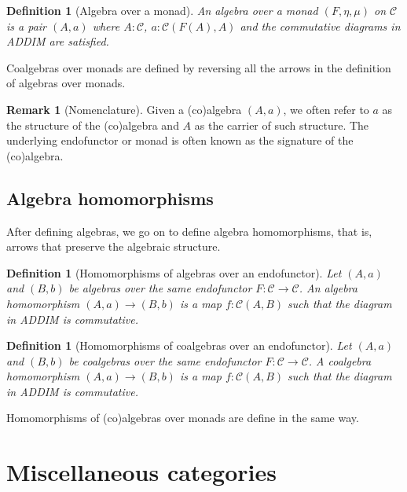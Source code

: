\documentclass[12pt,a4paper,openright,twoside]{report}
\theoremstyle{plain}
\newtheorem{definition}[proposition]{Definition}
\theoremstyle{definition}
\newtheorem{remark}[proposition]{Remark}
\begin{document}
\begin{definition}[Algebra over a monad]
  \label{def: monalg}
  An algebra over a monad $(F, \eta, \mu)$ on $\mathcal{C}$ is a pair $(A,a)$ where $A: \mathcal{C}$, $a:\mathcal{C}(F(A),A)$ and the commutative diagrams in ADDIM are satisfied.
\end{definition}

Coalgebras over monads are defined by reversing all the arrows in the definition of algebras over monads.

\begin{remark}[Nomenclature]
  Given a (co)algebra $(A, a)$, we often refer to $a$ as the structure of the (co)algebra and $A$ as the carrier of such structure. The underlying endofunctor or monad is often known as the signature of the (co)algebra.
\end{remark}

\subsection{Algebra homomorphisms}

After defining algebras, we go on to define algebra homomorphisms, that is, arrows that preserve the algebraic structure.

\begin{definition}[Homomorphisms of algebras over an endofunctor]
  Let $(A,a)$ and $(B,b)$ be algebras over the same endofunctor $F: \mathcal{C} \to \mathcal{C}$. An algebra homomorphism $(A,a)\to (B,b)$ is a map $f: \mathcal{C}(A,B)$ such that the diagram in ADDIM is commutative.
\end{definition}

\begin{definition}[Homomorphisms of coalgebras over an endofunctor]
  Let $(A,a)$ and $(B,b)$ be coalgebras over the same endofunctor $F: \mathcal{C} \to \mathcal{C}$. A coalgebra homomorphism $(A,a) \to (B,b)$ is a map $f: \mathcal{C}(A,B)$ such that the diagram in ADDIM is commutative.
\end{definition}

Homomorphisms of (co)algebras over monads are define in the same way. 








\section{Miscellaneous categories}
\end{document}
